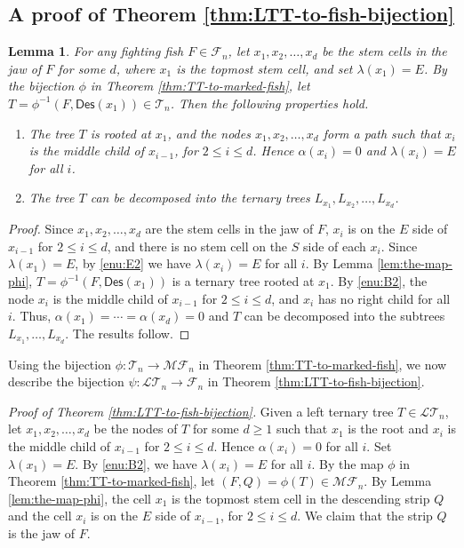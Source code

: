 \documentclass[a4paper,11pt,reqno]{amsart}
\newtheorem{lem}{Lemma}[section]
\theoremstyle{definition}
\numberwithin{equation}{section}
\newcommand{\Des}{{\textsf{Des}}}
\newcommand{\MF}{{\mathcal{MF}}}
\newcommand{\LT}{{\mathcal{LT}}}
\newcommand{\F}{{\mathcal{F}}}
\newcommand{\T}{{\mathcal{T}}}
\begin{document}
\subsection{A proof of Theorem \ref{thm:LTT-to-fish-bijection}}


\begin{lem} \label{lem:stem-cells-in-jaw}
For any fighting fish $F\in\F_n$, let $x_1,x_2,\dots,x_d$ be the stem cells in the jaw of $F$ for some $d$, where $x_1$ is the topmost stem cell, and set $\lambda(x_1)=E$.  By the bijection $\phi$ in Theorem \ref{thm:TT-to-marked-fish}, let $T=\phi^{-1}(F,\Des(x_1))\in\T_n$.  Then the following properties hold.
\begin{enumerate}
\item The tree $T$ is rooted at $x_1$, and the nodes $x_1,x_2,\dots,x_d$ form a path such that $x_i$ is the middle child of $x_{i-1}$, for $2\le i\le d$. Hence $\alpha(x_i)=0$ and $\lambda(x_i)=E$ for all $i$.
\item The tree $T$ can be decomposed into the ternary trees $L_{x_1}, L_{x_2},\dots, L_{x_d}$.
\end{enumerate}
\end{lem}

\begin{proof}
Since $x_1,x_2,\dots,x_d$ are the stem cells in the jaw of $F$, $x_i$ is on the $E$ side of $x_{i-1}$ for $2\le i\le d$, and there is no stem cell on the $S$ side of each $x_i$. Since $\lambda(x_1)=E$, by \ref{enu:E2} we have $\lambda(x_i)=E$ for all $i$.
By Lemma \ref{lem:the-map-phi}, $T=\phi^{-1}(F,\Des(x_1))$ is a ternary tree rooted at $x_1$.
By \ref{enu:B2}, the node $x_i$ is the middle child of $x_{i-1}$ for $2\le i\le d$, and $x_i$ has no right child for all $i$.  Thus, $\alpha(x_1)=\cdots=\alpha(x_d)=0$ and $T$ can be decomposed into the subtrees $L_{x_1},\dots, L_{x_d}$. The results follow.
\end{proof}





Using the bijection $\phi:\T_n\rightarrow\MF_n$ in Theorem \ref{thm:TT-to-marked-fish}, we now describe the bijection $\psi:\LT_n\rightarrow\F_n$ in Theorem \ref{thm:LTT-to-fish-bijection}.

\smallskip
\noindent
\emph{Proof of Theorem \ref{thm:LTT-to-fish-bijection}.}
Given a left ternary tree $T\in\LT_n$,  let $x_1, x_2,\dots, x_d$ be the nodes of $T$ for some $d\geq 1$ such that $x_1$ is the root and $x_i$ is the middle child of $x_{i-1}$ for $2\le i\le d$. Hence $\alpha(x_i)=0$ for all $i$. Set $\lambda(x_1)=E$.   By \ref{enu:B2}, we have $\lambda(x_i)=E$ for all $i$. By the map $\phi$ in Theorem \ref{thm:TT-to-marked-fish}, let $(F,Q)=\phi(T)\in\MF_n$. By Lemma \ref{lem:the-map-phi}, the cell $x_1$ is the topmost stem cell in the descending strip $Q$ and the cell $x_i$ is on the $E$ side of $x_{i-1}$, for $2\le i\le d$. We claim that the strip $Q$ is the jaw of $F$.
\end{document}
